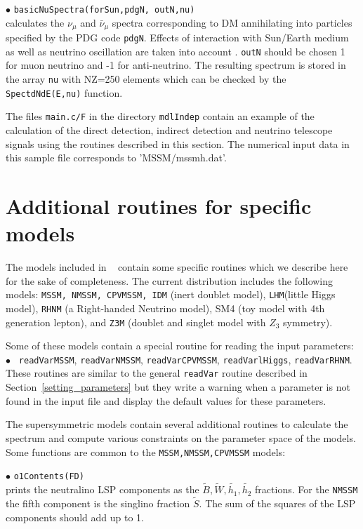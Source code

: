 \documentclass[12pt,a4paper]{article}
\begin{document}
\noindent
$\bullet$ \verb|basicNuSpectra(forSun,pdgN, outN,nu)|\\
calculates the $\nu_{\mu}$ and $\bar{\nu}_{\mu}$  spectra corresponding to  DM annihilating into particles specified by the PDG code {\tt pdgN}. Effects of interaction with Sun/Earth medium as well as neutrino oscillation  are taken into account \cite{Cirelli:2005gh}.
{\tt outN} should be chosen 1 for muon neutrino and -1 for anti-neutrino. The resulting spectrum is stored in the array 
  \verb|nu| with NZ=250 elements  which can be checked by the {\tt SpectdNdE(E,nu)}
function.


The files {\verb|main.c/F|} in the directory {\tt mdlIndep}  contain an example of the calculation of the direct detection,  indirect detection
and neutrino telescope signals using the routines described in this section. 
The numerical input data in this sample file corresponds to 'MSSM/mssmh.dat'. 




\section{Additional routines for specific models}
The models included in \micro~ contain some specific routines
which we describe here for the sake of completeness. The current 
distribution includes the following models: {\tt MSSM, NMSSM, CPVMSSM, IDM}  (inert doublet model), {\tt LHM}(little Higgs model),
{\tt RHNM} (a Right-handed Neutrino model), SM4 (toy model with 4th generation lepton), and {\tt Z3M} (doublet and singlet model with $Z_3$ symmetry). 

Some of these models contain a special routine for reading the input parameters:\\
$\bullet$ \verb| readVarMSSM|, \verb|readVarNMSSM|,  \verb|readVarCPVMSSM|,
\verb|readVarlHiggs|, \verb|readVarRHNM|.\\
 These routines  are similar to the general 
\verb|readVar| routine described  in Section~\ref{setting_parameters}
but  they write a warning when a parameter is not found in the 
input file and display the default values for these parameters.

The supersymmetric models contain several additional routines to calculate the spectrum
and compute various constraints on the parameter space of the models. Some functions are
common to the \verb|MSSM,NMSSM,CPVMSSM| models: 


\noindent
$\bullet$  \verb|o1Contents(FD)|\\
prints  the neutralino LSP components as the  $\tilde{B},\tilde{W},
\tilde{h_1},\tilde{h_2}$ fractions. For the {\tt NMSSM} the fifth component is
the singlino fraction  $\tilde{S}$. The sum of the squares of the LSP components
should add up to 1. 
\end{document}
